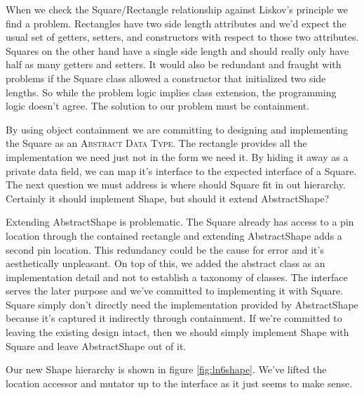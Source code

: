 \documentclass[]{tufte-handout}
\begin{document}
When we check the Square/Rectangle relationship against Liskov's principle we find a problem. Rectangles have two side length attributes and we'd expect the usual set of getters, setters, and constructors with respect to those two attributes. Squares on the other hand have a single side length and should really only have half as many getters and setters. It would also be redundant and fraught with problems if the Square class allowed a constructor that initialized two side lengths. So while the problem logic implies class extension, the programming logic doesn't agree. The solution to our problem must be containment.  

By using object containment we are committing to designing and implementing the Square as an \textsc{Abstract Data Type}.  The rectangle provides all the implementation we need just not in the form we need it. By hiding it away as a private data field, we can map it's interface to the expected interface of a Square. The next question we must address is where should Square fit in out hierarchy. Certainly it should implement Shape, but should it extend AbstractShape? 

Extending AbstractShape is problematic. The Square already has access to a pin location through the contained rectangle and extending AbstractShape adds a second pin location. This redundancy could be the cause for error and it's aesthetically unpleasant. On top of this, we added the abstract class as an implementation detail and not to establish a taxonomy of classes. The interface serves the later purpose and we've committed to implementing it with Square. Square simply don't directly need the implementation provided by AbstractShape because it's captured it indirectly through containment. If we're committed to leaving the existing design intact, then we should simply implement Shape with Square and leave AbstractShape out of it. 


Our new Shape hierarchy is shown in figure \ref{fig:ln6shape}. We've lifted the location accessor and mutator up to the interface as it just seems to make sense. 
\end{document}
